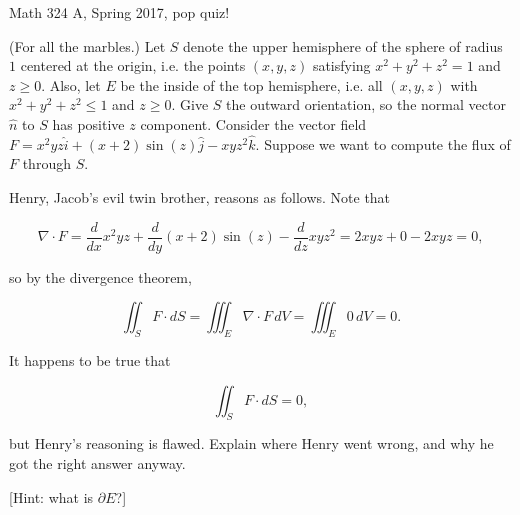 \documentclass{exam}
\begin{document}
 
\begin{center} \begin{Large} Math 324 A, Spring 2017, pop quiz! \end{Large}
\end{center} 

\vspace{5mm}

\begin{center}
\end{center}

\vspace{1cm}
 

\vspace{1cm}

\begin{questions}
\question (For all the marbles.) Let $S$ denote the upper hemisphere of the sphere of radius $1$ centered at the origin, i.e. the points $(x,y,z)$ satisfying $x^2 + y^2 + z^2 = 1$ and $z \geq 0$. Also, let $E$ be the inside of the top hemisphere, i.e. all $(x,y,z)$ with $x^2 + y^2 + z^2 \leq 1$ and $z \geq 0$. Give $S$ the outward orientation, so the normal vector $\widehat{n}$ to $S$ has positive $z$ component. Consider the vector field $F = x^2 y z \hat{i} + (x+2) \sin(z)\hat{j} - xyz^2 \hat{k}$. Suppose we want to compute the flux of $F$ through $S$. 

\vspace{2mm}

Henry, Jacob's evil twin brother, reasons as follows. Note that 

\begin{equation}
\nabla \cdot F = \frac{d}{d x} x^2 y z + \frac{d}{dy} (x+2) \sin(z) - \frac{d}{d z} xy z^2 = 2xyz +0 - 2xyz = 0,\nonumber
\end{equation}

so by the divergence theorem,

\begin{equation} 
\iint_S F \cdot dS = \iiint_E \nabla \cdot F \, dV = \iiint_E 0 \, dV = 0. \nonumber
\end{equation}

It happens to be true that 

\begin{equation}
\iint_S F \cdot dS = 0, \nonumber
\end{equation}

but Henry's reasoning is flawed. Explain where Henry went wrong, and why he got the right answer anyway.

[Hint: what is $\partial E$?]

\end{questions}
\end{document}
